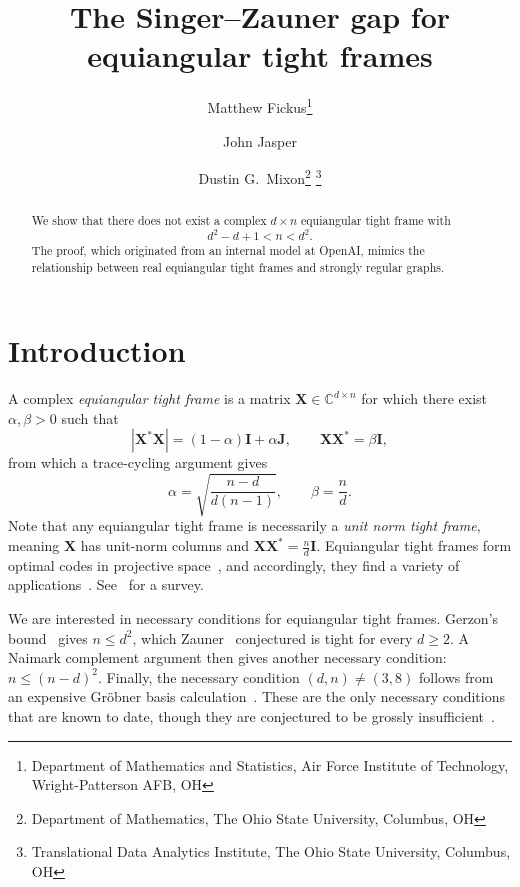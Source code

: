 \documentclass{article}
\title{The Singer--Zauner gap for equiangular tight frames}
\author{Matthew Fickus\thanks{Department of Mathematics and Statistics, Air Force Institute of Technology, Wright-Patterson AFB, OH} \and John Jasper\footnotemark[1] \and Dustin G.\ Mixon\thanks{Department of Mathematics, The Ohio State University, Columbus, OH} \thanks{Translational Data Analytics Institute, The Ohio State University, Columbus, OH}}
\date{}
\theoremstyle{plain}
\theoremstyle{definition}
\begin{document}
\maketitle

\begin{abstract}
We show that there does not exist a complex $d\times n$ equiangular tight frame with
\[
d^2-d+1<n<d^2.
\]
The proof, which originated from an internal model at OpenAI, mimics the relationship between real equiangular tight frames and strongly regular graphs.
\end{abstract}

\section{Introduction}

A complex \textit{equiangular tight frame} is a matrix $\boldsymbol{X}\in\mathbb{C}^{d\times n}$ for which there exist $\alpha,\beta>0$ such that
\[
|\boldsymbol{X}^*\boldsymbol{X}|=(1-\alpha)\boldsymbol{I}+\alpha\boldsymbol{J},
\qquad
\boldsymbol{X}\boldsymbol{X}^*
=\beta\boldsymbol{I},
\]
from which a trace-cycling argument gives
\[
\alpha=\sqrt{\frac{n-d}{d(n-1)}},
\qquad
\beta=\frac{n}{d}.
\]
Note that any equiangular tight frame is necessarily a \textit{unit norm tight frame}, meaning $\boldsymbol{X}$ has unit-norm columns and $\boldsymbol{X}\boldsymbol{X}^*
=\frac{n}{d}\boldsymbol{I}$.
Equiangular tight frames form optimal codes in projective space~\cite{Welch:74,CohnK:07}, and accordingly, they find a variety of applications~\cite{StrohmerH:03,HolmesP:04,RenesBSC:04,MixonQKF:13,BandeiraFMW:13}.
See~\cite{FickusM:15} for a survey.

We are interested in necessary conditions for equiangular tight frames.
Gerzon's bound~\cite{LemmensS:73} gives $n\leq d^2$, which Zauner~\cite{Zauner:99} conjectured is tight for every $d\geq2$.
A Naimark complement argument then gives another necessary condition: $n\leq (n-d)^2$.
Finally, the necessary condition $(d,n)\neq(3,8)$ follows from an expensive Gr\"obner basis calculation~\cite{Szollosi:14}.
These are the only necessary conditions that are known to date, though they are conjectured to be grossly insufficient~\cite{Mixon:15,Mixon:19}.
\end{document}
